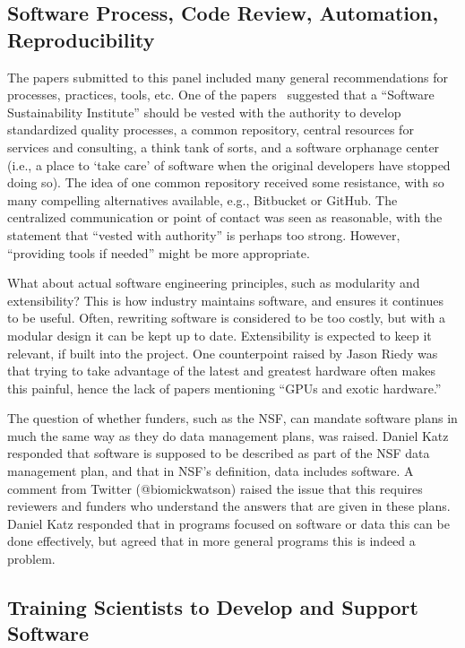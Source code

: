 \documentclass[11pt, oneside]{amsart}
\begin{document}
\subsection{Software Process, Code Review, Automation, Reproducibility}

The papers submitted to this panel included many general
recommendations for processes, practices, tools, etc. One of the
papers~\cite{Crawford_WSSSPE}
suggested that a ``Software Sustainability
Institute'' should be vested with the authority to develop
standardized quality processes, a common repository, central resources
for services and consulting, a think tank of sorts, and a software
orphanage center (i.e., a place to `take care' of software when the
original developers have stopped doing so). The idea of one common
repository received some resistance, with so many compelling
alternatives available, e.g., Bitbucket or GitHub. The centralized
communication or point of contact was seen as reasonable, with the
statement that ``vested with authority'' is perhaps too strong. However,
``providing tools if needed'' might be more appropriate.

What about actual software engineering principles, such as modularity
and extensibility? This is how industry maintains software, and
ensures it continues to be useful. Often, rewriting software is
considered to be too costly, but with a modular design it can be kept
up to date. Extensibility is expected to keep it relevant, if built
into the project. One counterpoint raised by Jason Riedy was that
trying to take advantage of the latest and greatest hardware often
makes this painful, hence the lack of papers mentioning ``GPUs and
exotic hardware.''

The question of whether funders, such as the NSF, can mandate software
plans in much the same way as they do data management plans, was
raised. Daniel Katz responded that software is supposed to be
described as part of the NSF data management plan, and that in NSF's
definition, data includes software. A comment from Twitter
(@biomickwatson) raised the issue that this requires reviewers and
funders who understand the answers that are given in these
plans. Daniel Katz responded that in programs focused on software or
data this can be done effectively, but agreed that in more general
programs this is indeed a problem.

\subsection{Training Scientists to Develop and Support Software}
\end{document}
